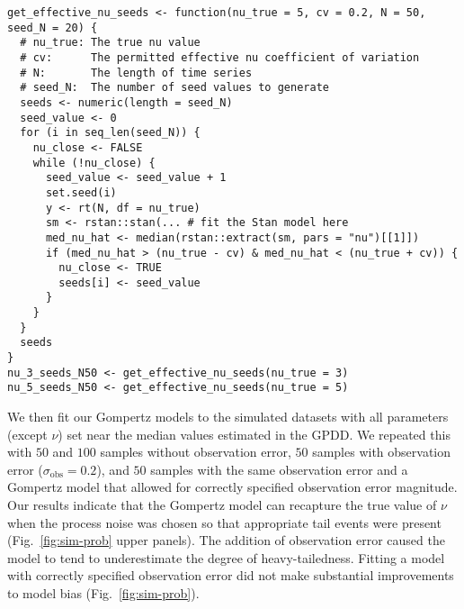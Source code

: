 \begin{footnotesize}
\begin{verbatim}
get_effective_nu_seeds <- function(nu_true = 5, cv = 0.2, N = 50, seed_N = 20) {
  # nu_true: The true nu value
  # cv:      The permitted effective nu coefficient of variation
  # N:       The length of time series
  # seed_N:  The number of seed values to generate
  seeds <- numeric(length = seed_N)
  seed_value <- 0
  for (i in seq_len(seed_N)) {
    nu_close <- FALSE
    while (!nu_close) {
      seed_value <- seed_value + 1
      set.seed(i)
      y <- rt(N, df = nu_true)
      sm <- rstan::stan(... # fit the Stan model here
      med_nu_hat <- median(rstan::extract(sm, pars = "nu")[[1]])
      if (med_nu_hat > (nu_true - cv) & med_nu_hat < (nu_true + cv)) {
        nu_close <- TRUE
        seeds[i] <- seed_value
      }
    }
  }
  seeds
}
nu_3_seeds_N50 <- get_effective_nu_seeds(nu_true = 3)
nu_5_seeds_N50 <- get_effective_nu_seeds(nu_true = 5)
\end{verbatim}
\end{footnotesize}

We then fit our Gompertz models to the simulated datasets with all parameters
(except $\nu$) set near the median values estimated in the GPDD. We repeated
this with $50$ and $100$ samples without observation error, $50$ samples with
observation error ($\sigma_\mathrm{obs} = 0.2$), and $50$ samples with the
same observation error and a Gompertz model that allowed for correctly
specified observation error magnitude. Our results indicate that the Gompertz
model can recapture the true value of $\nu$ when the process noise was chosen
so that appropriate tail events were present (Fig.~\ref{fig:sim-prob} upper
panels). The addition of observation error caused the model to tend to
underestimate the degree of heavy-tailedness. Fitting a model with correctly
specified observation error did not make substantial improvements to model
bias (Fig.~\ref{fig:sim-prob}).


